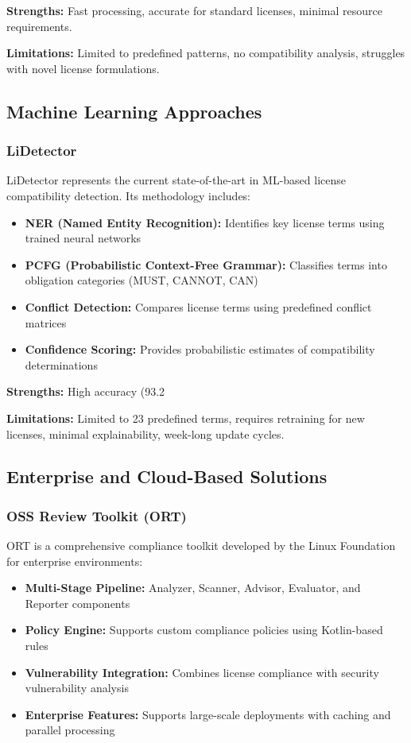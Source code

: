 \documentclass[9pt,twocolumn]{article}
\begin{document}
\textbf{Strengths:} Fast processing, accurate for standard licenses, minimal resource requirements.

\textbf{Limitations:} Limited to predefined patterns, no compatibility analysis, struggles with novel license formulations.

\subsection{Machine Learning Approaches}

\subsubsection{LiDetector}
LiDetector represents the current state-of-the-art in ML-based license compatibility detection. Its methodology includes:

\begin{itemize}
    \item \textbf{NER (Named Entity Recognition):} Identifies key license terms using trained neural networks
    \item \textbf{PCFG (Probabilistic Context-Free Grammar):} Classifies terms into obligation categories (MUST, CANNOT, CAN)
    \item \textbf{Conflict Detection:} Compares license terms using predefined conflict matrices
    \item \textbf{Confidence Scoring:} Provides probabilistic estimates of compatibility determinations
\end{itemize}

\textbf{Strengths:} High accuracy (93.2%

\textbf{Limitations:} Limited to 23 predefined terms, requires retraining for new licenses, minimal explainability, week-long update cycles.

\subsection{Enterprise and Cloud-Based Solutions}

\subsubsection{OSS Review Toolkit (ORT)}
ORT is a comprehensive compliance toolkit developed by the Linux Foundation for enterprise environments:

\begin{itemize}
    \item \textbf{Multi-Stage Pipeline:} Analyzer, Scanner, Advisor, Evaluator, and Reporter components
    \item \textbf{Policy Engine:} Supports custom compliance policies using Kotlin-based rules
    \item \textbf{Vulnerability Integration:} Combines license compliance with security vulnerability analysis
    \item \textbf{Enterprise Features:} Supports large-scale deployments with caching and parallel processing
\end{itemize}
\end{document}
